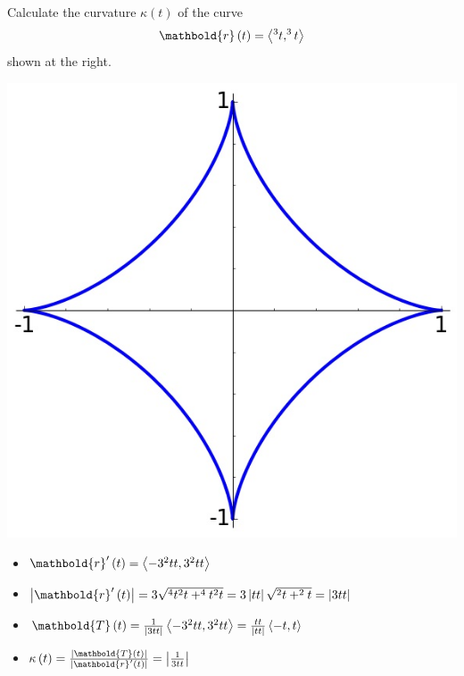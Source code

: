 \documentclass[12pt,addpoints]{exam}
\let\cos\relax\DeclareMathOperator{\cos}{\mathsf{cos}}
\let\sin\relax\DeclareMathOperator{\sin}{\mathsf{sin}}
\begin{document}
\begin{questions}
\ifprintanswers\else\begin{multicols}{2}\fi
\question[30] Calculate the curvature
$\kappa\left(t\right)$ of the curve
\[\mathbold{r}\left(t\right)
=\left\langle\cos^3{t},\sin^3{t}
\right\rangle\]
\ifprintanswers\else
shown at the right.
\begin{center}\includegraphics[scale=.4]{Astroid}\end{center}
\end{multicols}\fi
\begin{solution}
\begin{itemize}
\item $\mathbold{r}'\left(t\right)=
\left\langle -3\cos^2{t}\sin{t},3\sin^2{t}\cos{t}
\right\rangle$
\item $\left|\mathbold{r}'\left(t\right)\right|=
3\sqrt{\cos^4{t}\sin^2{t}+\sin^4{t}\cos^2{t}}
=3\left|\cos{t}\sin{t}\right|\sqrt{\sin^2{t}+\cos^2{t}}
=\left|3\cos{t}\sin{t}\right|$
\item $\mathbold{T}\left(t\right)
=\frac{1}{\left|3\cos{t}\sin{t}\right|}
\left\langle -3\cos^2{t}\sin{t},3\sin^2{t}\cos{t}
\right\rangle
=\frac{\sin{t}\cos{t}}{\left|\sin{t}\cos{t}\right|}
\left\langle -\cos{t},\sin{t}\right\rangle$
\item $\kappa\left(t\right)
=\frac{\left|\mathbold{T}\left(t\right)\right|}
{\left|\mathbold{r}'\left(t\right)\right|}
=\left|\frac{1}{3\sin{t}\cos{t}}\right|$
\end{itemize}
\end{solution}

\end{questions}
\end{document}
